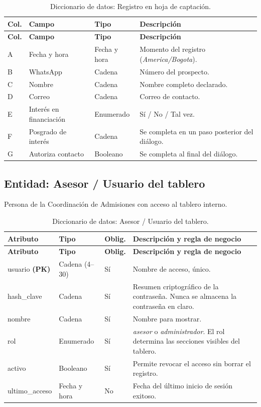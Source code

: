 \documentclass[12pt,a4paper]{report}
\newcommand{\tablacompacta}{\setstretch{1.1}\small}
\newcommand{\cabecera}[1]{\rowcolor{filacabecera}#1}
\begin{document}
{\tablacompacta
\begin{longtable}{p{2.0cm}p{3.6cm}p{2.0cm}p{5.0cm}}
\caption{Diccionario de datos: Registro en hoja de captación.}\label{tab:dd-hoja}\\
\toprule
\cabecera{\textbf{Col.}} & \textbf{Campo} & \textbf{Tipo} & \textbf{Descripción} \\
\midrule
\endfirsthead
\toprule
\textbf{Col.} & \textbf{Campo} & \textbf{Tipo} & \textbf{Descripción} \\
\midrule
\endhead
\bottomrule
\endfoot
A & Fecha y hora & Fecha y hora & Momento del registro (\textit{America/Bogota}). \\
B & WhatsApp & Cadena & Número del prospecto. \\
C & Nombre & Cadena & Nombre completo declarado. \\
D & Correo & Cadena & Correo de contacto. \\
E & Interés en financiación & Enumerado & Sí / No / Tal vez. \\
F & Posgrado de interés & Cadena & Se completa en un paso posterior del diálogo. \\
G & Autoriza contacto & Booleano & Se completa al final del diálogo. \\
\end{longtable}}

\subsection{Entidad: Asesor / Usuario del tablero}

Persona de la Coordinación de Admisiones con acceso al tablero interno.

{\tablacompacta
\begin{longtable}{p{3.1cm}p{2.2cm}p{1.3cm}p{6.0cm}}
\caption{Diccionario de datos: Asesor / Usuario del tablero.}\label{tab:dd-asesor}\\
\toprule
\cabecera{\textbf{Atributo}} & \textbf{Tipo} & \textbf{Oblig.} & \textbf{Descripción y regla de negocio} \\
\midrule
\endfirsthead
\toprule
\textbf{Atributo} & \textbf{Tipo} & \textbf{Oblig.} & \textbf{Descripción y regla de negocio} \\
\midrule
\endhead
\bottomrule
\endfoot
usuario \textbf{(PK)} & Cadena (4--30) & Sí & Nombre de acceso, único. \\
hash\_clave & Cadena & Sí & Resumen criptográfico de la contraseña. Nunca se almacena la contraseña en claro. \\
nombre & Cadena & Sí & Nombre para mostrar. \\
rol & Enumerado & Sí & \textit{asesor} o \textit{administrador}. El rol determina las secciones visibles del tablero. \\
activo & Booleano & Sí & Permite revocar el acceso sin borrar el registro. \\
ultimo\_acceso & Fecha y hora & No & Fecha del último inicio de sesión exitoso. \\
\end{longtable}}
\end{document}
